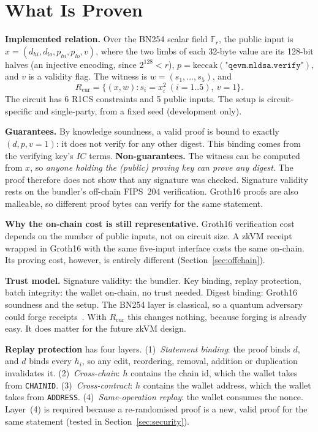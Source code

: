 \documentclass[conference]{IEEEtran}
\begin{document}
\section{What Is Proven}\label{sec:proof}

\textbf{Implemented relation.} Over the BN254 scalar field $\mathbb{F}_r$, the public input is $x=(d_{hi}, d_{lo}, p_{hi}, p_{lo}, v)$, where the two limbs of each 32-byte value are its 128-bit halves (an injective encoding, since $2^{128}<r$), $p=\mathrm{keccak}(\texttt{"qevm.mldsa.verify"})$, and $v$ is a validity flag. The witness is $w=(s_1,\dots,s_5)$, and
\begin{equation}
R_{\mathrm{cur}}=\{(x,w): s_i=x_i^2\ (i=1..5),\ v=1\}.
\end{equation}
The circuit has 6 R1CS constraints and 5 public inputs. The setup is circuit-specific and single-party, from a fixed seed (development only).

\textbf{Guarantees.} By knowledge soundness, a valid proof is bound to exactly $(d,p,v{=}1)$: it does not verify for any other digest. This binding comes from the verifying key's $IC$ terms. \textbf{Non-guarantees.} The witness can be computed from $x$, so \emph{anyone holding the (public) proving key can prove any digest}. The proof therefore does not show that any signature was checked. Signature validity rests on the bundler's off-chain FIPS~204 verification. Groth16 proofs are also malleable, so different proof bytes can verify for the same statement.

\textbf{Why the on-chain cost is still representative.} Groth16 verification cost depends on the number of public inputs, not on circuit size. A zkVM receipt wrapped in Groth16 with the same five-input interface costs the same on-chain. Its proving cost, however, is entirely different (Section~\ref{sec:offchain}).

\textbf{Trust model.} Signature validity: the bundler. Key binding, replay protection, batch integrity: the wallet on-chain, no trust needed. Digest binding: Groth16 soundness and the setup. The BN254 layer is classical, so a quantum adversary could forge receipts~\cite{risczero2026security}. With $R_{\mathrm{cur}}$ this changes nothing, because forging is already easy. It does matter for the future zkVM design.

\textbf{Replay protection} has four layers. (1)~\emph{Statement binding}: the proof binds $d$, and $d$ binds every $h_i$, so any edit, reordering, removal, addition or duplication invalidates it. (2)~\emph{Cross-chain}: $h$ contains the chain id, which the wallet takes from \texttt{CHAINID}. (3)~\emph{Cross-contract}: $h$ contains the wallet address, which the wallet takes from \texttt{ADDRESS}. (4)~\emph{Same-operation replay}: the wallet consumes the nonce. Layer~(4) is required because a re-randomised proof is a new, valid proof for the same statement (tested in Section~\ref{sec:security}).
\end{document}
